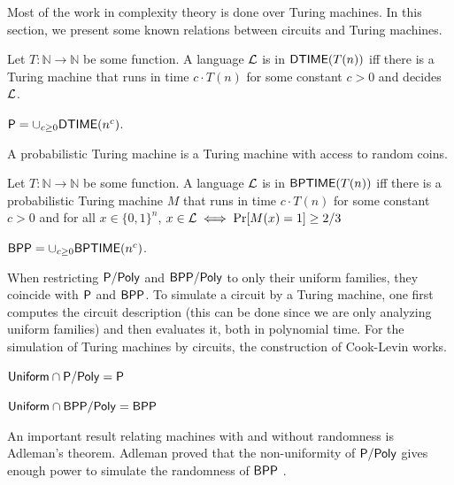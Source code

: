 Most of the work in complexity theory is done over Turing machines.
In this section, we present some known relations between circuits and Turing machines.


\begin{definition}[$\DTIME$]
    Let $T : \mathbb{N} \to \mathbb{N}$ be some function. 
    A language $\mathcal{L}$ is in $\mathsf{DTIME}(T(n))$ iff there is a Turing machine that runs in time $c \cdot T(n)$ for some constant $c > 0$ and decides $\mathcal{L}$.
\end{definition}


\begin{definition}
    $\mathsf{P} = \cup_{c \geq 0} \mathsf{DTIME}(n^c)$.
\end{definition}

A probabilistic Turing machine is a Turing machine with access to random coins.


\begin{definition}[$\BPTIME$]
    Let $T : \mathbb{N} \to \mathbb{N}$ be some function. 
    A language $\mathcal{L}$ is in $\mathsf{BPTIME}(T(n))$ iff there is a probabilistic Turing machine $M$ that runs in time $c \cdot T(n)$ for some constant $c > 0$ and for all $x \in \{0,1\}^n$, $x \in \mathcal{L} \iff \Pr[M(x) = 1] \geq 2/3$
\end{definition}


\begin{definition}
    $\mathsf{BPP} = \cup_{c \geq 0} \mathsf{BPTIME}(n^c)$.
\end{definition}

When restricting $\mathsf{P/Poly}$ and $\mathsf{BPP/Poly}$ to only their uniform families, they coincide with $\mathsf{P}$ and $\mathsf{BPP}$.
To simulate a circuit by a Turing machine, one first computes the circuit description (this can be done since we are only analyzing uniform families) and then evaluates it, both in polynomial time.
For the simulation of Turing machines by circuits, the construction of Cook-Levin works.

\begin{theorem}\label{uppoly-equals-p} $\mathsf{Uniform} \cap \mathsf{P/Poly} = \mathsf{P}$ \end{theorem}

\begin{theorem}\label{urppoly-equals-bpp} $\mathsf{Uniform} \cap \mathsf{BPP/Poly} = \mathsf{BPP}$ \end{theorem}

An important result relating machines with and without randomness is Adleman's theorem.
Adleman proved that the non-uniformity of $\mathsf{P/Poly}$ gives enough power to simulate the randomness of $\mathsf{BPP}$ \citep{charles1981relative}.

